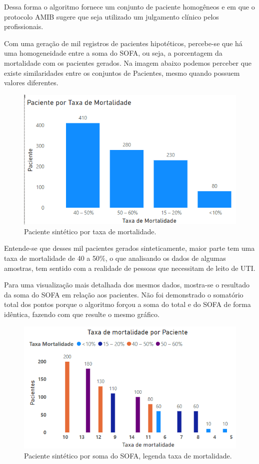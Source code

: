 \documentclass[12pt]{article}
\begin{document}
Dessa forma o algoritmo fornece um conjunto de paciente homogêneos e em que o protocolo AMIB sugere que seja utilizado um julgamento clínico pelos profissionais.


Com uma geração de mil registros de pacientes hipotéticos, percebe-se que há uma homogeneidade entre a soma do SOFA, ou seja, a porcentagem da mortalidade com os pacientes gerados. Na imagem abaixo podemos perceber que existe similaridades entre os conjuntos de Pacientes, mesmo quando possuem valores diferentes.

\begin{figure}[!htb]
    \centering
    \includegraphics[scale=0.9]{img/Taxa de Mortalidade2.png}
    \centering
    \caption{Paciente sintético por taxa de mortalidade.}
    \label{Paciente-gerado-taxa-mortalidade}
\end{figure}

Entende-se que desses mil pacientes gerados sinteticamente, maior parte tem uma taxa de mortalidade de 40 a 50\%, o que analisando os dados de algumas amostras, tem sentido com a realidade de pessoas que necessitam de leito de UTI.

Para uma visualização mais detalhada dos mesmos dados, mostra-se o resultado da soma do SOFA em relação aos pacientes. Não foi demonstrado o somatório total dos pontos porque o algoritmo forçou a soma do total e do SOFA de forma idêntica, fazendo com que resulte o mesmo gráfico.

\begin{figure}[!htb]
    \centering
    \includegraphics[scale=0.9]{img/Taxa de Mortalidade.png}
    \centering
    \caption{Paciente sintético por soma do SOFA, legenda taxa de mortalidade.}
    \label{Paciente-gerado-por-SOFA-legenda-taxa-mortalidade}
\end{figure}
\end{document}
